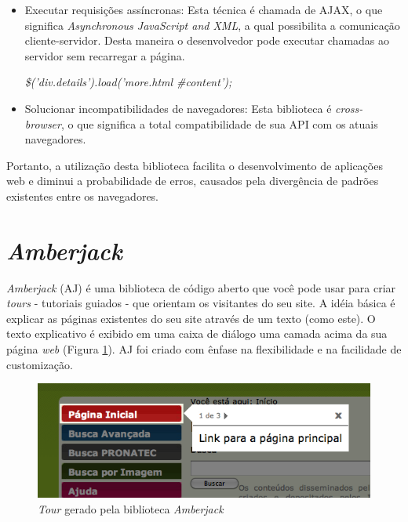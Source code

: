 \begin{itemize}
\item Executar requisições assíncronas: Esta técnica é chamada de AJAX, o que significa \textit{Asynchronous JavaScript and XML}, a qual possibilita a comunicação cliente-servidor. Desta maneira o desenvolvedor pode executar chamadas ao servidor sem recarregar a página.

\begin{center}
\textit{\$('div.details').load('more.html \#content');}
\end{center}

\item Solucionar incompatibilidades de navegadores: Esta biblioteca é \textit{cross-browser}, o que significa a total compatibilidade de sua API com os atuais navegadores.
\end{itemize}

Portanto, a utilização desta biblioteca facilita o desenvolvimento de aplicações web e diminui a probabilidade de erros, causados pela divergência de padrões existentes entre os navegadores.

\section{\textit{Amberjack}}
\label{sec:amberjack}

\textit{Amberjack} (AJ) é uma biblioteca de código aberto que você pode usar para criar \textit{tours} - tutoriais guiados - que orientam os visitantes do seu site. A idéia básica é explicar as páginas existentes do seu site através de um texto (como este). O texto explicativo é exibido em uma caixa de diálogo uma camada acima da sua página \textit{web} (Figura \ref{figura_22}). AJ foi criado com ênfase na flexibilidade e na facilidade de customização.

\begin{figure}[ht]
    \centering
    \includegraphics[width=0.9 \textwidth]{figuras/figura_33}
    \caption{\textit{Tour} gerado pela biblioteca \textit{Amberjack}}
    \label{figura_22}
\end{figure}

